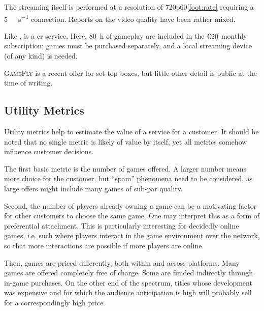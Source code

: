 
The streaming itself is performed at a resolution of
720p60\cref{foot:rate} requiring a \SI{5}{\mega\bit\per\second}
connection. Reports on the video quality have been rather
mixed.



Like \gfnowpc, \liquid is a \gls{cr} service. Here, \SI{80}{\hour} of
gameplay are included in the $\text{\texteuro}20$ monthly subscription;
games must be purchased separately, and a local streaming device
(of any kind) is needed.

\textsc{GameFly} is a recent offer for set-top boxes, but little
other detail is public at the time of writing.


\subsection{Utility Metrics}

Utility metrics help to estimate the value of a service for a customer.
It should be noted that no single metric is likely of value by itself,
yet all metrics somehow influence customer decisions.

The first basic metric is the number of games offered. A larger number
means more choice for the customer, but ``spam'' phenomena need to
be considered, as large offers might include many games of sub-par quality.

Second, the number of players already owning a game can be a
motivating factor for other customers to choose the same game.
One may interpret this as a form of preferential attachment.
This is particularly interesting for decidedly online games, i.e.
such where players interact in the game environment over the network,
so that more interactions are possible if more players are online.

Then, games are priced differently, both within and across
platforms. Many games are offered completely free of charge.
Some are funded indirectly through in-game purchases. On the
other end of the spectrum, titles whose development was expensive
and for which the audience anticipation is high will probably sell
for a correspondingly high price.

